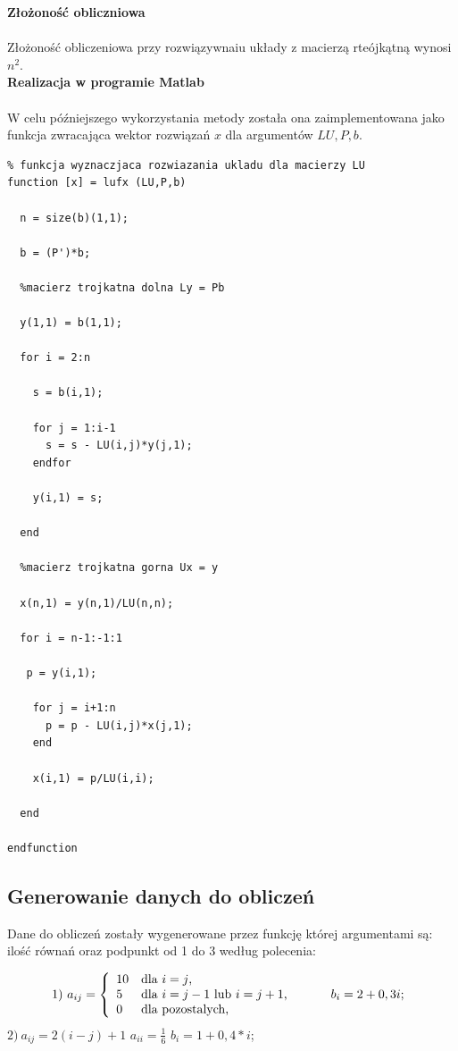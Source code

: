 \documentclass[a4paper, 11pt]{article}
\begin{document}
\textbf{Złożoność obliczniowa}\\
\\
Złożoność obliczeniowa przy rozwiązywnaiu układy z macierzą rteójkątną wynosi $n^2$.\\

\textbf{Realizacja w programie Matlab}\\
\\
W celu późniejszego wykorzystania metody została ona zaimplementowana jako funkcja zwracająca wektor rozwiązań $x$ dla argumentów $LU,P,b$.

\begin{lstlisting}
% funkcja wyznaczjaca rozwiazania ukladu dla macierzy LU
function [x] = lufx (LU,P,b)

  n = size(b)(1,1);

  b = (P')*b;

  %macierz trojkatna dolna Ly = Pb

  y(1,1) = b(1,1);

  for i = 2:n

    s = b(i,1);
  
    for j = 1:i-1
      s = s - LU(i,j)*y(j,1);
    endfor
  
    y(i,1) = s;
  
  end

  %macierz trojkatna gorna Ux = y

  x(n,1) = y(n,1)/LU(n,n);

  for i = n-1:-1:1

   p = y(i,1);
  
    for j = i+1:n
      p = p - LU(i,j)*x(j,1);
    end
  
    x(i,1) = p/LU(i,i);
  
  end

endfunction

\end{lstlisting}

\subsection{Generowanie danych do obliczeń}
Dane do obliczeń zostały wygenerowane przez funkcję której argumentami są: ilość równań oraz podpunkt od 1 do 3 według polecenia:

$$
1) \ a_{ij} = \left\{ \begin{array}{ll}
10 & \textrm{dla $i=j$,}\\
5 & \textrm{dla $i=j-1$ lub $i=j+1$, \hspace{1cm} $b_{i} = 2+0,3i$;}\\
0 & \textrm{dla pozostalych,}
\end{array} \right.
$$
\hspace{3cm} $2) \ a_{ij} = 2(i-j)+1$ \hspace{1cm} $a_{ii} = \frac{1}{6}$ \hspace{1cm} $b_{i} =1+0,4*i$; \\
\end{document}
